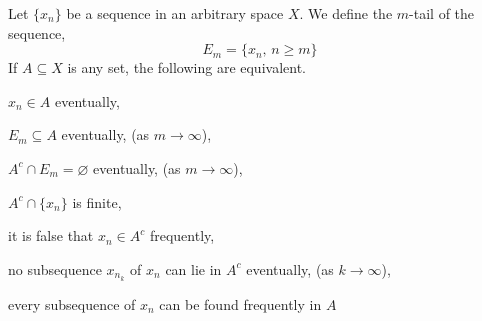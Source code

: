 \documentclass[../../main.tex]{subfiles}
\begin{document}
\providecommand{\xn}{\{x_n\}}

\begin{wts}\label{theorem:eventual behaviour of sequences}
    Let $\xn$ be a sequence in an arbitrary space $X$. We define the $m$-tail of the sequence, 
    \[
    E_m = \{x_n,\,n\geq m\}
    \]
    If $A\subseteq X$ is any set, the following are equivalent.
    \begin{enumalpha}
        \item $x_n\in A$ eventually,\label{claim_ea}
        \item $E_m\subseteq A$ eventually, (as $m\to\infty$),\label{claim_eb}
        \item $A^c\cap E_m=\varnothing$ eventually, (as $m\to\infty$),\label{claim_ec}
        \item $A^c\cap \{x_n\}$ is finite,\label{claim_ed}
        \item it is false that $x_n\in A^c$ frequently,\label{claim_ee}
        \item no subsequence $x_{n_k}$ of $x_n$ can lie in $A^c$ eventually, (as $k\to\infty$),\label{claim_ef}
        \item every subsequence of $x_n$ can be found frequently in $A$\label{claim_eg}
    \end{enumalpha}
\end{wts}
\end{document}

